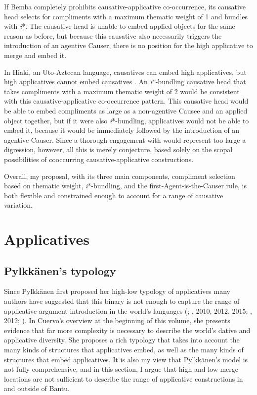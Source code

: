 \documentclass[output=paper,modfonts,nonflat,colorlinks,citecolor=brown]{langsci/langscibook}
\begin{document}
If Bemba completely prohibits causative-applicative co-occurrence, its causative head selects for compliments with a maximum thematic weight of 1 and bundles with \textit{i}*. The causative head is unable to embed applied objects for the same reason as before, but because this causative also necessarily triggers the introduction of an agentive Causer, there is no position for the high applicative to merge and embed it. 



In Hiaki, an Uto-Aztecan language, causatives can embed high applicatives, but high applicatives cannot embed causatives \citep{Jung2014}. An \textit{i}*-bundling causative head that takes compliments with a maximum thematic weight of 2 would be consistent with this causative-applicative co-occurrence pattern. This causative head would be able to embed compliments as large as a non-agentive Causee and an applied object together, but if it were also \textit{i}*-bundling, applicatives would not be able to embed it, because it would be immediately followed by the introduction of an agentive Causer. Since a thorough engagement with \citet{Jung2014} would represent too large a digression, however, all this is merely conjecture, based solely on the scopal possibilities of cooccurring causative-applicative constructions. 


Overall, my proposal, with its three main components, compliment selection based on thematic weight, \textit{i}*-bundling, and the first-Agent-is-the-Causer rule, is both flexible and constrained enough to account for a range of causative variation. 

\section{Applicatives}\label{sec:wechsler:3}

\subsection{Pylkkänen’s typology}\label{sec:wechsler:3.1}

Since Pylkkänen first proposed her high-low typology of applicatives \citeyear{Pylkkänen2002} many authors have suggested that this binary is not enough to capture the range of applicative argument introduction in the world’s languages (\citealt{Jeong2007,Peterson2007};  \citealt{GeorgalaEtAl2008,Cuervo2003}, 2010, 2012, 2015; \citealt{Tsai2009,Kim2011thesis}, 2012; \citealt{Georgala2012}). In Cuervo’s overview at the beginning of this volume, she presents evidence that far more complexity is necessary to describe the world’s dative and applicative diversity. She proposes a rich typology that takes into account the many kinds of structures that applicatives embed, as well as the many kinds of structures that embed applicatives. It is also my view that Pylkkänen’s model is not fully comprehensive, and in this section, I argue that high and low merge locations are not sufficient to describe the range of applicative constructions in and outside of Bantu. 
\end{document}
